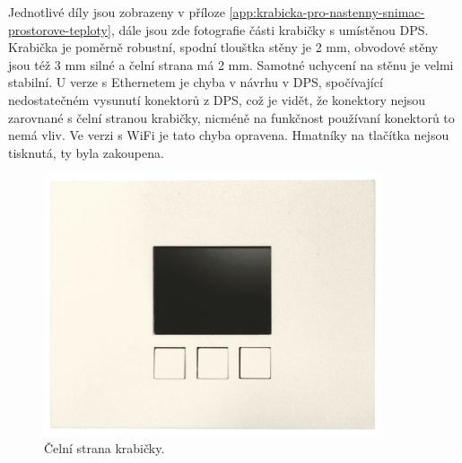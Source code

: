 Jednotlivé díly jsou zobrazeny v příloze \ref{app:krabicka-pro-nastenny-snimac-prostorove-teploty}, dále jsou zde fotografie části krabičky s umístěnou DPS. Krabička je poměrně robustní, spodní tlouštka stěny je 2 mm, obvodové stěny jsou též 3 mm silné a čelní strana má 2 mm. Samotné uchycení na stěnu je velmi stabilní. U verze s Ethernetem je chyba v návrhu v DPS, spočívající nedostatečném vysunutí konektorů z DPS, což je vidět, že konektory nejsou zarovnané s čelní stranou krabičky, nicméně na funkčnost používaní konektorů to nemá vliv. Ve verzi s WiFi je tato chyba opravena. Hmatníky na tlačítka nejsou tisknutá, ty byla zakoupena.
 
\begin{figure}[H]
    \centering
    \includegraphics[width=0.89\textwidth]{images/krabicka-nastenny-snimac-prostorove-teploty/krabicka-nastenny-snimac-prostorove-teploty-predni-strana-displej.png}
   \caption{Čelní strana krabičky.}
    \label{fig:krabicka-nastenny-snimac-prostorove-teploty-predni-strana-displej}
\end{figure}
